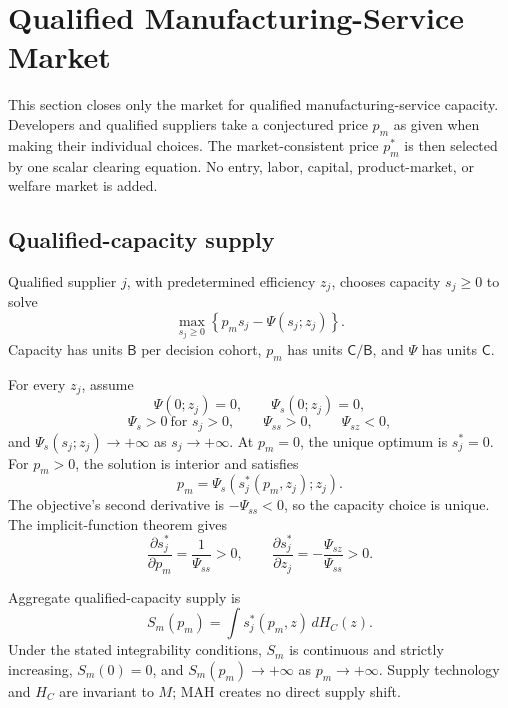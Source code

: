 \section{Qualified Manufacturing-Service Market}
\label{sec:p06-cmo-market}

This section closes only the market for qualified manufacturing-service
capacity. Developers and qualified suppliers take a conjectured price \(p_m\)
as given when making their individual choices. The market-consistent price
\(p_m^*\) is then selected by one scalar clearing equation. No entry, labor,
capital, product-market, or welfare market is added.

\subsection{Qualified-capacity supply}
\label{subsec:p06-supply}

Qualified supplier \(j\), with predetermined efficiency \(z_j\), chooses
capacity \(s_j\geq0\) to solve
\begin{equation}
  \max_{s_j\geq0}
  \left\{
    p_ms_j-\Psi(s_j;z_j)
  \right\}.
  \label{eq:p06-supplier-problem}
\end{equation}
Capacity has units \(\mathsf B\) per decision cohort, \(p_m\) has units
\(\mathsf C/\mathsf B\), and \(\Psi\) has units \(\mathsf C\).

For every \(z_j\), assume
\[
  \Psi(0;z_j)=0,\qquad \Psi_s(0;z_j)=0,
\]
\[
  \Psi_s>0\ \text{for }s_j>0,\qquad
  \Psi_{ss}>0,\qquad
  \Psi_{sz}<0,
\]
and \(\Psi_s(s_j;z_j)\to+\infty\) as \(s_j\to+\infty\).
At \(p_m=0\), the unique optimum is \(s_j^*=0\). For \(p_m>0\), the
solution is interior and satisfies
\begin{equation}
  p_m=\Psi_s\!\left(s_j^*(p_m,z_j);z_j\right).
  \label{eq:p06-supplier-capacity}
\end{equation}
The objective's second derivative is
\(-\Psi_{ss}<0\), so the capacity choice is unique. The
implicit-function theorem gives
\begin{equation}
  \frac{\partial s_j^*}{\partial p_m}
  =
  \frac{1}{\Psi_{ss}}>0,
  \qquad
  \frac{\partial s_j^*}{\partial z_j}
  =
  -\frac{\Psi_{sz}}{\Psi_{ss}}>0.
  \label{eq:p06-capacity-derivatives}
\end{equation}

Aggregate qualified-capacity supply is
\begin{equation}
  S_m(p_m)
  =
  \int s_j^*(p_m,z)\,dH_C(z).
  \label{eq:p06-aggregate-supply}
\end{equation}
Under the stated integrability conditions, \(S_m\) is continuous and
strictly increasing, \(S_m(0)=0\), and
\(S_m(p_m)\to+\infty\) as \(p_m\to+\infty\). Supply technology and
\(H_C\) are invariant to \(M\); MAH creates no direct supply shift.

